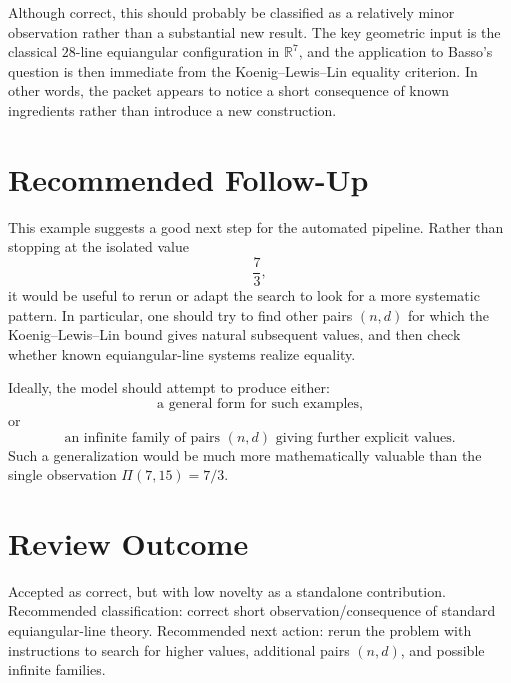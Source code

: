 \documentclass[11pt]{article}
\begin{document}
Although correct, this should probably be classified as a relatively minor observation rather than a substantial new result. The key geometric input is the classical \(28\)-line equiangular configuration in \(\mathbb R^7\), and the application to Basso's question is then immediate from the Koenig--Lewis--Lin equality criterion. In other words, the packet appears to notice a short consequence of known ingredients rather than introduce a new construction.

\section*{Recommended Follow-Up}

This example suggests a good next step for the automated pipeline. Rather than stopping at the isolated value
\[
\frac73,
\]
it would be useful to rerun or adapt the search to look for a more systematic pattern. In particular, one should try to find other pairs \((n,d)\) for which the Koenig--Lewis--Lin bound gives natural subsequent values, and then check whether known equiangular-line systems realize equality.

Ideally, the model should attempt to produce either:
\[
\text{a general form for such examples,}
\]
or
\[
\text{an infinite family of pairs }(n,d)\text{ giving further explicit values.}
\]
Such a generalization would be much more mathematically valuable than the single observation \(\Pi(7,15)=7/3\).

\section*{Review Outcome}

Accepted as correct, but with low novelty as a standalone contribution. Recommended classification: correct short observation/consequence of standard equiangular-line theory. Recommended next action: rerun the problem with instructions to search for higher values, additional pairs \((n,d)\), and possible infinite families.
\end{document}
